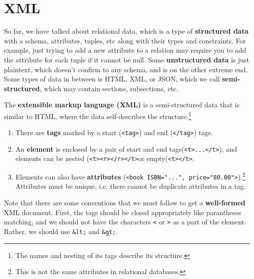 \section{XML} 

  So far, we have talked about relational data, which is a type of \textbf{structured data} with a schema, attributes, tuples, etc along with their types and constraints. For example, just trying to add a new attribute to a relation may require you to add the attribute for each tuple if it cannot be null. Some \textbf{unstructured data} is just plaintext, which doesn't confirm to any schema, and is on the other extreme end. Some types of data in between is HTML, XML, or JSON, which we call \textbf{semi-structured}, which may contain sections, subsections, etc. 

  \begin{definition}[XML]
    The \textbf{extensible markup language (XML)} is a semi-structured data that is similar to HTML, where the data self-describes the structure.\footnote{The names and nesting of its tags describe its structure.} 
    \begin{enumerate}
      \item There are \textbf{tags} marked by a start (\texttt{<tag>}) and end (\texttt{</tag>}) tags. 
      \item An \textbf{element} is enclosed by a pair of start and end tags(\texttt{<t>...</t>}), and elements can be nested (\texttt{<t><r></r></t>}or empty(\texttt{<t></t>}.  
      \item Elements can also have \textbf{attributes} (\texttt{<book ISBN="...", price="80.00">}).\footnote{This is not the same attributes in relational databases.} Attributes must be unique, i.e. there cannot be duplicate attributes in a tag. 
    \end{enumerate}
    Note that there are some conventions that we must follow to get a \textbf{well-formed} XML document. First, the tags should be closed appropriately like parantheses matching, and we should not have the characters \texttt{<} or \texttt{>} as a part of the element. Rather, we should use \texttt{\&lt;} and \texttt{\&gt;}. 
  \end{definition}


